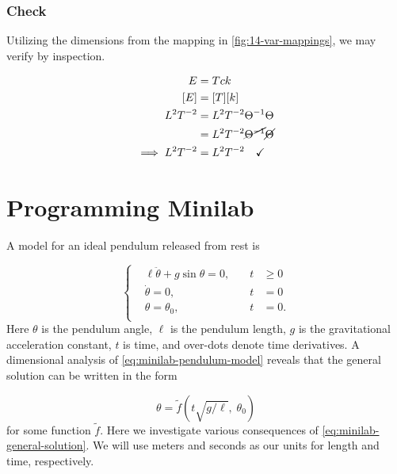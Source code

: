 \documentclass[12pt]{article}
\begin{document}
  \subsubsection*{Check}
  Utilizing the dimensions from the mapping in \cref{fig:14-var-mappings}, we
  may verify by inspection.

  \begin{equation*}
    \begin{aligned}
      E &= Tck \\
      [E] &= [T][k] \\
      L^2T^{-2} &= L^2T^{-2}\Theta^{-1} \Theta \\
       &= L^2T^{-2} \cancel{\Theta^{-1}} \cancel{\Theta} \\
      \implies L^2T^{-2} &= L^2T^{-2} \quad\checkmark \\
    \end{aligned}
  \end{equation*}

\skiptooddpage{}
\section{Programming Minilab}
A model for an ideal pendulum released from rest is

\begin{equation}
  \label{eq:minilab-pendulum-model}
   \left\{
  \begin{aligned}
    &\ell\ddot{\theta}+g\sin\theta = 0, \quad &t &\ge0 \\
    &\dot{\theta} = 0, \quad &t &= 0 \\
    &\theta = \theta_0, \quad &t &= 0. \\
  \end{aligned}\right.
\end{equation}
Here $\theta$ is the pendulum angle, $\ell$ is the pendulum length, $g$ is the
gravitational acceleration constant, $t$ is time, and over-dots denote time
derivatives. A dimensional analysis of \cref{eq:minilab-pendulum-model} reveals
that the general solution can be written in the form

\begin{equation}
  \label{eq:minilab-general-solution}
  \theta = \tilde{f}(t\sqrt{g/\ell}, \;\theta_0)
\end{equation}
for some function $\tilde{f}$. Here we investigate various consequences of
\cref{eq:minilab-general-solution}. We will use meters and seconds as our units
for length and time, respectively.
\end{document}
